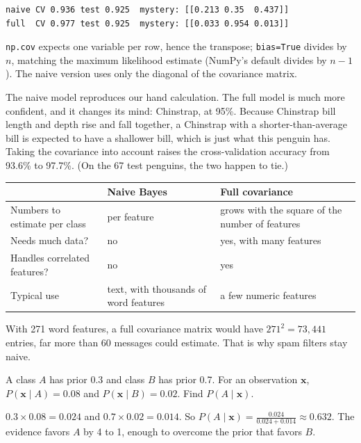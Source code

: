\begin{verbatim}
naive CV 0.936 test 0.925  mystery: [[0.213 0.35  0.437]]
full  CV 0.977 test 0.925  mystery: [[0.033 0.954 0.013]]
\end{verbatim}

\verb|np.cov| expects one variable per row, hence the transpose; \verb|bias=True| divides by $n$, matching the
maximum likelihood estimate (NumPy's default divides by $n - 1$). The naive version uses only the diagonal of the
covariance matrix.

The naive model reproduces our hand calculation. The full model is much more confident, and it changes its
mind: Chinstrap, at 95\%. Because Chinstrap bill length and depth rise and fall together, a Chinstrap with a
shorter-than-average bill is expected to have a shallower bill, which is just what this penguin has. Taking the
covariance into account raises the cross-validation accuracy from 93.6\% to 97.7\%. (On the 67 test penguins,
the two happen to tie.)

\begin{center}
\begin{tabular}{>{\raggedright\arraybackslash}p{3.6cm} >{\raggedright\arraybackslash}p{4.2cm} >{\raggedright\arraybackslash}p{4.2cm}}
 & \textbf{Naive Bayes} & \textbf{Full covariance} \\
\hline
Numbers to estimate per class & 2 per feature & grows with the square of the number of features \\
Needs much data? & no & yes, with many features \\
Handles correlated features? & no & yes \\
Typical use & text, with thousands of word features & a few numeric features \\
\end{tabular}
\end{center}

With 271 word features, a full covariance matrix would have $271^2 = 73{,}441$ entries, far more than 60
messages could estimate. That is why spam filters stay naive.

\begin{Exercise}[label=bayes_classifier1, title={Posterior by hand}, space=3cm]
A class $A$ has prior 0.3 and class $B$ has prior 0.7. For an observation $\mathbf{x}$,
$P(\mathbf{x} \mid A) = 0.08$ and $P(\mathbf{x} \mid B) = 0.02$. Find $P(A \mid \mathbf{x})$.
\end{Exercise}
\begin{Answer}[ref=bayes_classifier1]
$0.3 \times 0.08 = 0.024$ and $0.7 \times 0.02 = 0.014$. So $P(A \mid \mathbf{x}) = \frac{0.024}{0.024 + 0.014}
\approx 0.632$. The evidence favors $A$ by 4 to 1, enough to overcome the prior that favors $B$.
\end{Answer}

